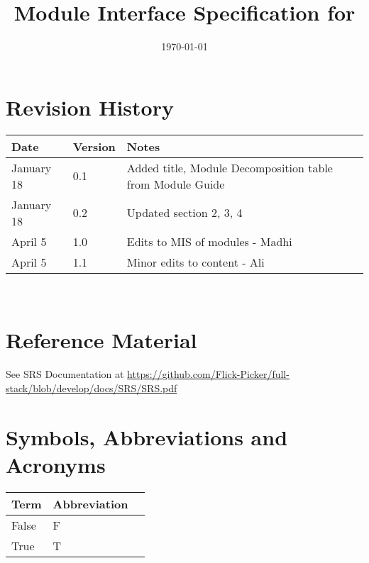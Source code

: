 \documentclass[12pt, titlepage]{article}
\begin{document}
\title{Module Interface Specification for \progname{}}

\author{\authname}

\date{\today}

\maketitle


\section{Revision History}

\begin{tabularx}{\textwidth}{p{3cm}p{2cm}X}
\toprule {\bf Date} & {\bf Version} & {\bf Notes}\\
\midrule
January 18 & 0.1 & Added title, Module Decomposition table from Module Guide\\
January 18 & 0.2 & Updated section 2, 3, 4\\
April 5 & 1.0 &  Edits to MIS of modules - Madhi \\
April 5 & 1.1 & Minor edits to content - Ali \\
\bottomrule
\end{tabularx}

~\newpage

\section{Reference Material}

See SRS Documentation at \url{https://github.com/Flick-Picker/full-stack/blob/develop/docs/SRS/SRS.pdf}

\section{Symbols, Abbreviations and Acronyms}

\begin{center}
	
	\renewcommand{\arraystretch}{1.2}
	\noindent 
	\begin{tabular}{l l p{7.5cm}} 
		\toprule 
		\textbf{Term} & \textbf{Abbreviation}\\ 
		\midrule
		False & F\\
		True & T\\
		\bottomrule
	\end{tabular}
\end{center}
\end{document}
